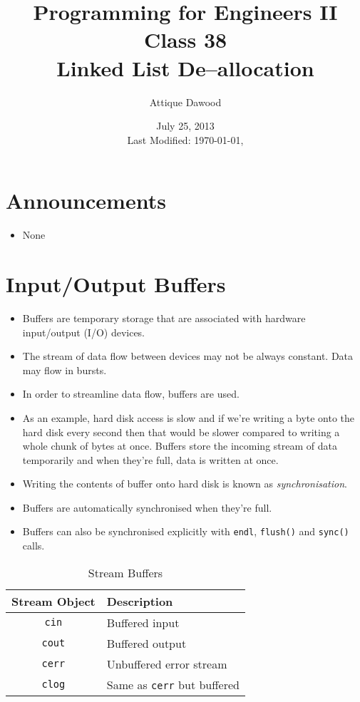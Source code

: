 \documentclass[12pt,a4paper]{article}
\title{\vspace{-2cm}Programming for Engineers II\\Class 38\\Linked List De--allocation}
\author{Attique Dawood}
\date{July 25, 2013\\[0.2cm] Last Modified: \today, \currenttime}
\begin{document}
\maketitle
\section{Announcements}
\begin{itemize}
\item None
\end{itemize}
\section{Input/Output Buffers}
\begin{itemize}
\item Buffers are temporary storage that are associated with hardware input/output (I/O) devices.
\item The stream of data flow between devices may not be always constant. Data may flow in bursts.
\item In order to streamline data flow, buffers are used.
\item As an example, hard disk access is slow and if we're writing a byte onto the hard disk every second then that would be slower compared to writing a whole chunk of bytes at once. Buffers store the incoming stream of data temporarily and when they're full, data is written at once.
\item Writing the contents of buffer onto hard disk is known as \textit{synchronisation}.
\item Buffers are automatically synchronised when they're full.
\item Buffers can also be synchronised explicitly with \verb|endl|, \verb|flush()| and \verb|sync()| calls.
\end{itemize}
\begin{table}[H]
\begin{center}
\vspace{0.3cm}
	\begin{tabular}{cl}
	\hline \hline
		\textbf{Stream Object} \rule{0pt}{2.6ex} & \textbf{Description}\\
		\hline
		\texttt{cin}\rule{0pt}{2.6ex} &  Buffered input\\
		\texttt{cout}\rule{0pt}{2.6ex} &  Buffered output\\
		\texttt{cerr}\rule{0pt}{2.6ex} &  Unbuffered error stream\\
		\texttt{clog}\rule{0pt}{2.6ex} &  Same as \verb|cerr| but buffered\\
	\hline \hline
	\end{tabular}
\end{center}
\label{StreamBuffers}
\caption{Stream Buffers}
\end{table}
\end{document}
